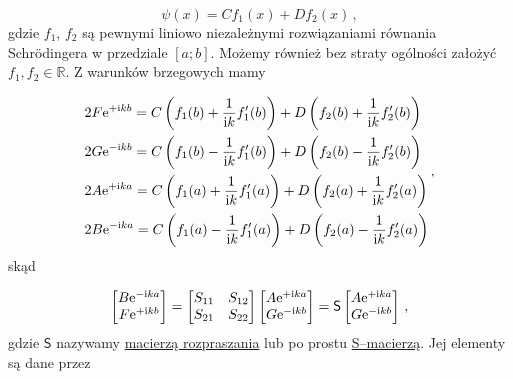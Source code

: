 \documentclass{myclass}
\begin{document}
\begin{equation*}
\psi(x)=Cf_1(x)+Df_2(x)\,,
\end{equation*}
gdzie \(f_1\), \(f_2\) są pewnymi liniowo niezależnymi rozwiązaniami równania Schr{\"o}dingera w
przedziale \([a;b]\). Możemy również bez straty ogólności założyć \(f_1,f_2\in\mathbb{R}\). Z
warunków brzegowych mamy

\begin{equation*}
\begin{split}
    &2F\mathrm{e}^{+\mathrm{i} kb}=C\left(f_1(b)+\frac{1}{\mathrm{i} k}f_1'(b)\right)+D\left(f_2(b)+\frac{1}{\mathrm{i} k}f_2'(b)\right)\\
    &2G\mathrm{e}^{-\mathrm{i} kb}=C\left(f_1(b)-\frac{1}{\mathrm{i} k}f_1'(b)\right)+D\left(f_2(b)-\frac{1}{\mathrm{i} k}f_2'(b)\right)\\
    &2A\mathrm{e}^{+\mathrm{i} ka}=C\left(f_1(a)+\frac{1}{\mathrm{i} k}f_1'(a)\right)+D\left(f_2(a)+\frac{1}{\mathrm{i} k}f_2'(a)\right)\\
    &2B\mathrm{e}^{-\mathrm{i} ka}=C\left(f_1(a)-\frac{1}{\mathrm{i} k}f_1'(a)\right)+D\left(f_2(a)-\frac{1}{\mathrm{i} k}f_2'(a)\right)
\end{split}\,,
\end{equation*}
skąd

\begin{equation*}
\begin{bmatrix}
B\mathrm{e}^{-\mathrm{i} ka}\\
F\mathrm{e}^{+\mathrm{i} kb}
\end{bmatrix}=\begin{bmatrix}
S_{11} & S_{12}\\
S_{21} & S_{22}
\end{bmatrix}\begin{bmatrix}
A\mathrm{e}^{+\mathrm{i} ka}\\
G\mathrm{e}^{-\mathrm{i} kb}
\end{bmatrix}=\mathsf{S}\begin{bmatrix}
A\mathrm{e}^{+\mathrm{i} ka}\\
G\mathrm{e}^{-\mathrm{i} kb}
\end{bmatrix}\,,
\end{equation*}
gdzie \(\mathsf{S}\) nazywamy \underline{macierzą rozpraszania} lub po prostu
\underline{S--macierzą}. Jej elementy są dane przez
\end{document}
